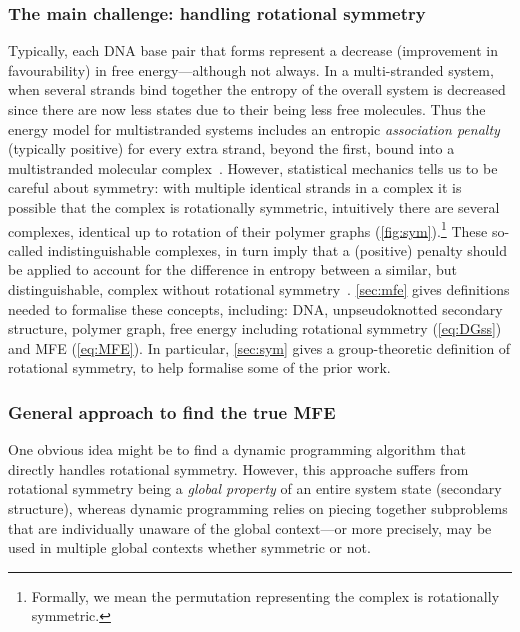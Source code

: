 \documentclass[11pt,letterpaper]{article}  \usepackage[margin=1in]{geometry}
\theoremstyle{definition}  \newtheorem{Definition}[theorem]{Definition}
\begin{document}
\subsubsection{The main challenge: handling rotational symmetry}

Typically, each DNA base pair that forms represent a decrease (improvement in favourability) in free energy---although not always. 
In a multi-stranded system, when several strands bind together the entropy of the overall system is decreased since there are now less states due to their being less free molecules.  
Thus the energy model for multistranded systems includes an entropic {\em association penalty} (typically positive) for every extra strand, beyond the first, bound into a multistranded molecular  complex~\cite{dirks2007thermodynamic}. 
However, statistical mechanics tells us to be careful about symmetry: with multiple identical strands in a complex it is possible that the complex is rotationally symmetric, 
intuitively  there are several complexes, identical up to rotation of their polymer graphs (\cref{fig:sym}).\footnote{Formally, we mean the permutation representing the complex is rotationally symmetric.} 
These so-called indistinguishable complexes, in turn imply that a (positive) penalty should be applied to account for the difference in entropy between a similar, but distinguishable, complex without  rotational symmetry~\cite{bormashenko2019entropy,atkins2023atkins,silbey2022physical,fornace2020unified}. 
\cref{sec:mfe} gives definitions needed  to formalise these concepts, including: DNA,  
unpseudoknotted secondary structure, polymer graph,  
free energy including rotational symmetry (\cref{eq:DGss}) and MFE (\cref{eq:MFE}). In particular, \cref{sec:sym} gives a  group-theoretic definition of rotational symmetry, to help formalise some of the prior work.

\subsubsection{General approach to find the true MFE}
One obvious idea might be to find a dynamic programming algorithm that directly handles rotational symmetry. 
However, this approache suffers from rotational symmetry being a {\em global property} of an entire system state (secondary structure), whereas dynamic programming relies on piecing together subproblems that are individually unaware of the global context---or more precisely, may be used in multiple global contexts whether symmetric or not.  
\end{document}
